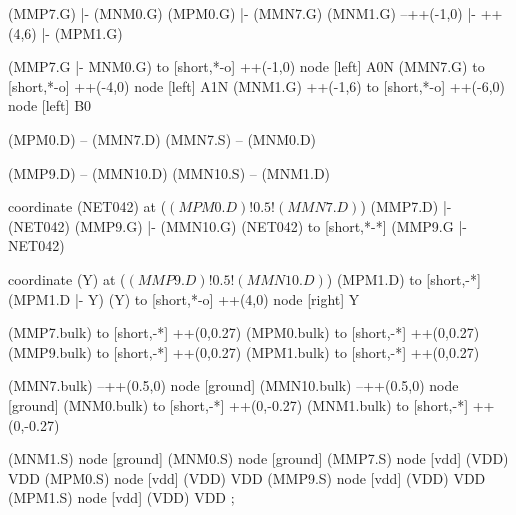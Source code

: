 \begin{circuitikz}[american]
	(MMP7.G) |- (MNM0.G)
	(MPM0.G) |- (MMN7.G)
	(MNM1.G) --++(-1,0) |- ++(4,6) |- (MPM1.G) 
	
	(MMP7.G |- MNM0.G) to [short,*-o] ++(-1,0) node [left] {A0N} 
	(MMN7.G) to [short,*-o] ++(-4,0) node [left] {A1N}
	(MNM1.G) ++(-1,6) to [short,*-o] ++(-6,0) node [left] {B0}
	
	(MPM0.D) -- (MMN7.D)
	(MMN7.S) -- (MNM0.D)
	
	(MMP9.D) -- (MMN10.D)
	(MMN10.S) -- (MNM1.D)
	
	coordinate (NET042) at ($(MPM0.D)!0.5!(MMN7.D)$)
	(MMP7.D) |- (NET042) 
	(MMP9.G) |- (MMN10.G)
	(NET042) to [short,*-*] (MMP9.G |- NET042)
	
	coordinate (Y) at ($(MMP9.D)!0.5!(MMN10.D)$)
	(MPM1.D) to [short,-*] (MPM1.D |- Y)
	(Y) to [short,*-o] ++(4,0) node [right] {Y}
	
	(MMP7.bulk) to [short,-*] ++(0,0.27)
	(MPM0.bulk) to [short,-*] ++(0,0.27)
	(MMP9.bulk) to [short,-*] ++(0,0.27)
	(MPM1.bulk) to [short,-*] ++(0,0.27)
	
	(MMN7.bulk) --++(0.5,0) node [ground]{}
	(MMN10.bulk) --++(0.5,0) node [ground]{}
	(MNM0.bulk) to [short,-*] ++(0,-0.27)	
	(MNM1.bulk) to [short,-*] ++(0,-0.27)


	(MNM1.S) node [ground] {}
	(MNM0.S) node [ground] {}
	(MMP7.S) node [vdd] (VDD) {VDD}
	(MPM0.S) node [vdd] (VDD) {VDD}
	(MMP9.S) node [vdd] (VDD) {VDD}
	(MPM1.S) node [vdd] (VDD) {VDD}
;

\end{circuitikz}

